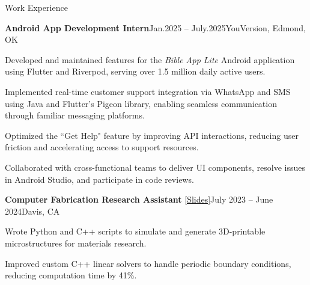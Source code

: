 \documentclass{resume} %
\begin{document}
    \begin{rSection}{Work Experience}

        \begin{rSubsection}{\textbf{Android App Development Intern}}{Jan.2025 – July.2025}{YouVersion, Edmond, OK}{}
            \item{Developed and maintained features for the \textit{Bible App Lite} Android application using Flutter and Riverpod, serving over 1.5 million daily active users.}
            \item{Implemented real-time customer support integration via WhatsApp and SMS using Java and Flutter’s Pigeon library, enabling seamless communication through familiar messaging platforms.}
            \item{Optimized the ``Get Help" feature by improving API interactions, reducing user friction and accelerating access to support resources.}
            \item{Collaborated with cross-functional teams to deliver UI components, resolve issues in Android Studio, and participate in code reviews.}
        \end{rSubsection}
    
        \begin{rSubsection}{\textbf{Computer Fabrication Research Assistant} \href{https://docs.google.com/presentation/d/1vE1fTo60TzdEpiMjofUK8VLwj55keTxsokcQTI54zJE/edit?usp=sharing}{[Slides]}}{July 2023 – June 2024}{Davis, CA}{}
            \item{Wrote Python and C++ scripts to simulate and generate 3D-printable microstructures for materials research.}
            \item{Improved custom C++ linear solvers to handle periodic boundary conditions, reducing computation time by 41\%.}
        \end{rSubsection}
    
    \end{rSection}

	
	
\end{document}
